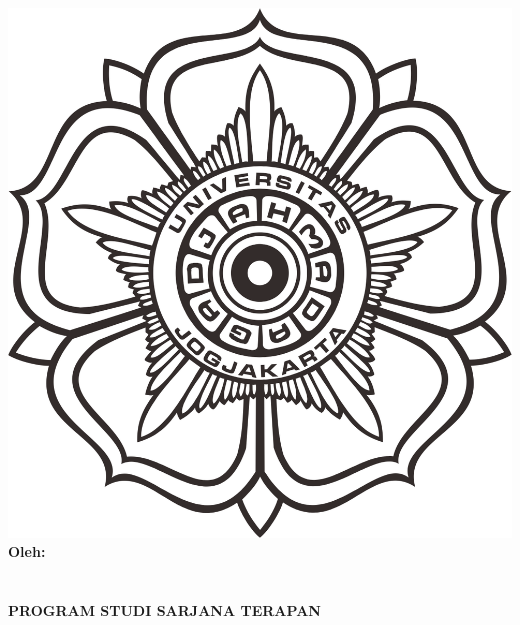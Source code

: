 \begin{titlepage}
    \begin{center}

        \begin{doublespace}
            \textbf{\MakeUppercase{\large{\tipe}}}\\[0.5cm]\textbf{\MakeUppercase{\large{\judulid}}}\\[0.75cm]
            
            \textbf{\MakeUppercase{\large{\judulen}}}\\[1cm]
        \end{doublespace}
        \includegraphics[width=0.35\linewidth]{gambar/logo-ugm.png}\\[1cm]

        \textbf{\large {Oleh:}} \\
        \textbf{\large \MakeUppercase{\underline{\penulis}}} \\
        \textbf{\large \MakeUppercase{{\nim}}} \\[1cm]


        \textbf{\large \MakeUppercase{Program Studi Sarjana Terapan \prodi}}\\
        \textbf{\large \MakeUppercase{\departemen}}\\
        \textbf{\large \MakeUppercase{\fakultas}}\\
        \textbf{\large \MakeUppercase{\universitas}}\\
        \textbf{\large \the\year{}}\\
    \end{center}
\end{titlepage}